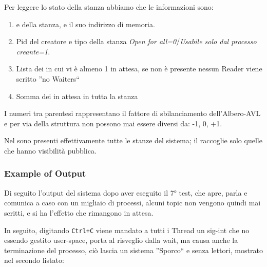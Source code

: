 Per leggere lo stato della stanza abbiamo che le informazioni sono:
\begin{enumerate}
 \item \tagSys e \keySys della stanza, e il suo indirizzo di memoria.
 \item Pid del creatore e tipo della stanza \textit{Open for all=0}/\textit{Usabile solo dal processo creante=1}.
 \item Lista dei \Topic in cui vi è almeno 1 \Reader in attesa, se non è presente nessun Reader viene scritto ''no
Waiters``
 \item Somma dei \Reader in attesa in tutta la stanza
\end{enumerate}

I numeri tra parentesi rappresentano il fattore di sbilanciamento dell'Albero-AVL e per via della struttura non possono
mai essere diversi da: -1, 0, +1.

Nel \tagTree sono presenti effettivamente tutte le stanze del sistema; il \keyTree raccoglie solo quelle che hanno
visibilità pubblica.

\subsubsection{Example of Output}

Di seguito l'output del sistema dopo aver eseguito il 7° test, che apre, parla e comunica a caso con un migliaio di
processi, alcuni topic non vengono quindi mai scritti, e si ha l'effetto che rimangono in attesa.

In seguito, digitando \verb|Ctrl+C| viene mandato a tutti i Thread un sig-int che no essendo gestito user-space, porta
al risveglio dalla wait, ma causa anche la terminazione del processo, ciò lascia un sistema ''Sporco`` e senza lettori,
mostrato nel secondo listato:

\newpage

